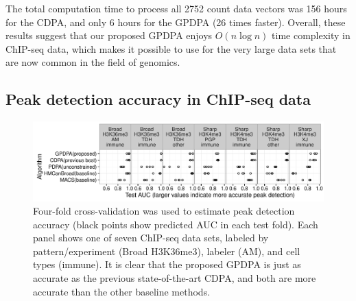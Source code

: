 \documentclass[twoside,11pt]{article}
\begin{document}
The total computation time to process all 2752 count data vectors was
156 hours for the CDPA, and only 6 hours for the GPDPA (26 times
faster). Overall, these results suggest that our proposed GPDPA enjoys
$O(n\log n)$ time complexity in ChIP-seq data, which makes it possible
to use for the very large data sets that are now common in the field of genomics.


\subsection{Peak detection accuracy in ChIP-seq data}


\begin{figure}[t!]
  \centering 
  \includegraphics[width=\textwidth]{figure-all-cv}
  \vskip -0.5cm
  \caption{Four-fold cross-validation was used to estimate peak
    detection accuracy (black points show predicted
    AUC in each test fold). Each panel shows one of seven ChIP-seq data
    sets, labeled by pattern/experiment (Broad H3K36me3), labeler
    (AM), and cell types (immune).  It is clear that the proposed
    GPDPA is just as accurate as the previous state-of-the-art CDPA,
    and both are more accurate than the other baseline methods.
  }
  \label{fig:test-error-dots}
\end{figure}
\end{document}
